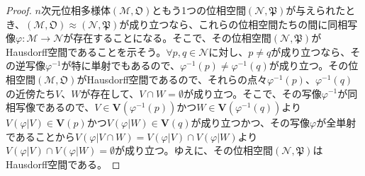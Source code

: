 \documentclass[dvipdfmx]{jsarticle}
\begin{document}
\begin{proof}
$n$次元位相多様体$\left( \mathcal{M},\mathfrak{O} \right)$ともう1つの位相空間$\left( \mathcal{N},\mathfrak{P} \right)$が与えられたとき、$\left( \mathcal{M},\mathfrak{O} \right) \approx \left( \mathcal{N},\mathfrak{P} \right)$が成り立つなら、これらの位相空間たちの間に同相写像$\varphi\mathcal{:M \rightarrow N}$が存在することになる。そこで、その位相空間$\left( \mathcal{N},\mathfrak{P} \right)$がHausdorff空間であることを示そう。$\forall p,q \in \mathcal{N}$に対し、$p \neq q$が成り立つなら、その逆写像$\varphi^{- 1}$が特に単射でもあるので、$\varphi^{- 1}(p) \neq \varphi^{- 1}(q)$が成り立つ。その位相空間$\left( \mathcal{M},\mathfrak{O} \right)$がHausdorff空間であるので、それらの点々$\varphi^{- 1}(p)$、$\varphi^{- 1}(q)$の近傍たち$V$、$W$が存在して、$V \cap W = \emptyset$が成り立つ。そこで、その写像$\varphi^{- 1}$が同相写像であるので、$V \in \mathbf{V}\left( \varphi^{- 1}(p) \right)$かつ$W \in \mathbf{V}\left( \varphi^{- 1}(q) \right)$より$V\left( \varphi|V \right) \in \mathbf{V}(p)$かつ$V\left( \varphi|W \right) \in \mathbf{V}(q)$が成り立つかつ、その写像$\varphi$が全単射であることから$V\left( \varphi|V \cap W \right) = V\left( \varphi|V \right) \cap V\left( \varphi|W \right)$より$V\left( \varphi|V \right) \cap V\left( \varphi|W \right) = \emptyset$が成り立つ。ゆえに、その位相空間$\left( \mathcal{N},\mathfrak{P} \right)$はHausdorff空間である。\par

\end{proof}
\end{document}
